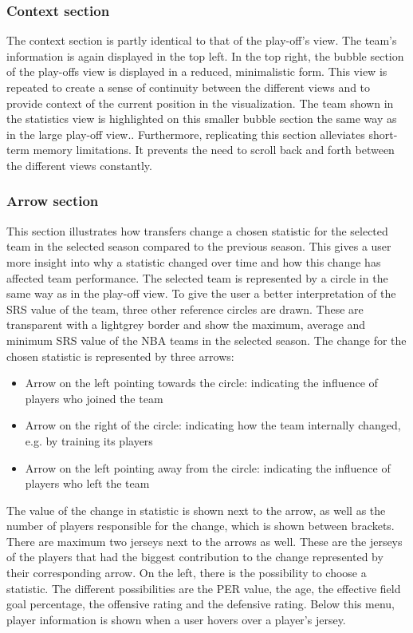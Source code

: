 \documentclass[]{sigchi}
\begin{document}
\subsubsection{Context section}
The context section is partly identical to that of the play-off's view. The
team's information is again displayed in the top left. In the top right, the
bubble section of the play-offs view is displayed in a reduced, minimalistic
form. This view is repeated to create a sense of continuity between the
different views and to provide context of the current position in the
visualization. The team shown in the statistics view is highlighted on this
smaller bubble section the same way as in the large play-off view.. Furthermore, replicating this section alleviates short-term memory limitations. It prevents the need to scroll back and forth between the different views constantly. 

\subsubsection{Arrow section}
This section illustrates how transfers change a chosen statistic for the selected team in the selected season compared to the previous season. This gives a user more 
insight into why a statistic changed over time and how this change has affected 
team performance. The selected team is represented by a circle in the same way as in the play-off view. To give the user a better interpretation of the SRS value of the team, three other reference circles are drawn. These are transparent with a lightgrey border and show the maximum, average and minimum SRS value of the NBA teams in the selected season. The change for the chosen statistic is represented by three arrows:
\begin{itemize}
    \item Arrow on the left pointing towards the circle: indicating the
        influence of players who joined the team
    \item Arrow on the right of the circle: indicating how the team internally
        changed, e.g. by training its players
    \item Arrow on the left pointing away from the circle: indicating the
        influence of players who left the team 
\end{itemize}
The value of the change in statistic is shown next to the arrow, as well as the number of 
players responsible for the change, which is shown between brackets. There are maximum two
jerseys next to the arrows as well. These are the jerseys of the players that 
had the biggest contribution to the change represented by their corresponding arrow.  
On the left, there is the possibility to choose a statistic. The different possibilities are the PER value, the age, the effective field goal percentage, the offensive rating and the defensive rating. Below this menu, player information is shown when a user hovers over a player's jersey. 
\end{document}
